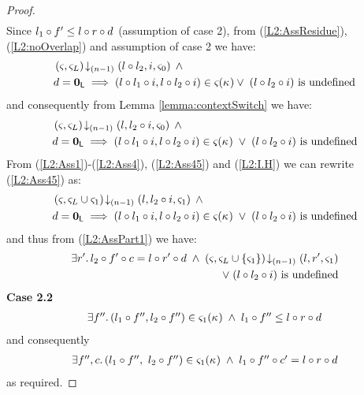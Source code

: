 \begin{lemma}[]
\begin{proof}
\begin{align}
\end{align} 
%
Since $l_1 \circ f' \leq l \circ r \circ d$ (assumption of case 2), from (\ref{L2:AssResidue}), (\ref{L2:noOverlap}) and assumption of case 2 we have:
%
\begin{align}
	& \left(\varsigma_{}, \varsigma_{L}\right) \!\downarrow_{(n-1)} \left(l \circ l_2, i, \varsigma_{0}\right) \;\land \nonumber\\
	& d = \mathbf{0}_{\textsf{L}} \implies (l \circ l_1 \circ i, l \circ l_2 \circ i) \in \varsigma_{}(\kappa_{}) \lor\; (l \circ l_2 \circ i) \text{ is undefined} \label{L2:Ass49}
\end{align} 
%
and consequently from Lemma  \ref{lemma:contextSwitch} we have:
%
\begin{align}
	& \left(\varsigma_{}, \varsigma_{L}\right) \!\downarrow_{(n-1)} \left(l , l_2 \circ  i, \varsigma_{0}\right) \;\land\  \nonumber\\
	& d = \mathbf{0}_{\textsf{L}} \implies (l \circ l_1 \circ i, l \circ l_2 \circ i) \in \varsigma_{}(\kappa_{}) \;\lor\; (l \circ l_2 \circ i) \text{ is undefined} \label{L2:Ass45}
\end{align} 
%
From (\ref{L2:Ass1})-(\ref{L2:Ass4}), (\ref{L2:Ass45}) and (\ref{L2:I.H}) we can rewrite (\ref{L2:Ass45}) as:
\begin{align}
	& \left(\varsigma_{}, \varsigma_{L} \cup \varsigma_{1}\right) \!\downarrow_{(n-1)} \left(l , l_2 \circ  i, \varsigma_{1}\right) \;\land \nonumber\\
	& d = \mathbf{0}_{\textsf{L}} \implies (l \circ l_1 \circ i, l \circ l_2 \circ i) \in \varsigma_{}(\kappa_{}) \;\lor\; (l \circ l_2 \circ i) \text{ is undefined} \label{L2:Ass52}
\end{align}
%
and thus from (\ref{L2:AssPart1}) we have:
%
\begin{align}
	\exists r'.\,	l_2 \circ f' \circ c = l \circ r' \circ d \;\land\; \left(\varsigma_{}, \varsigma_{L} \cup \{\varsigma_{1}\}\right) \!\downarrow_{(n-1)} \left(l , r', \varsigma_{1}\right) \nonumber\\
	\lor\; (l \circ l_2 \circ i) \text{ is undefined}\label{L2:Case2.1}
\end{align}
%
%
%
%
%
\noindent\textbf{Case 2.2} 
%
\[
\begin{array}{l}
	\exists f''.\, (l_1 \circ f'', l_2 \circ f'') \in \varsigma_{1}(\kappa_{}) \;\land\; l_1 \circ f'' \leq l \circ r \circ d
\end{array}
\]
and consequently 
\begin{align}
\begin{array}{l}
	\exists f'', c.\, (l_1 \circ f'',\ l_2 \circ f'') \in \varsigma_{1}(\kappa_{}) \;\land\; l_1 \circ f'' \circ c' = l \circ r \circ d
\end{array} \label{L2:Case2.2}
\end{align}
%
as required.
\end{proof}
\end{lemma}
